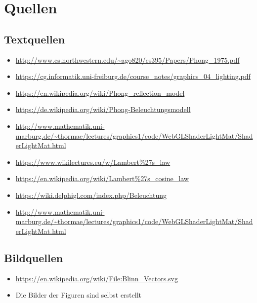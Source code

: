 \documentclass[a4paper]{scrartcl}%
\begin{document}
\newpage

\section{Quellen}%
\label{sec:quellen}

    \subsection{Textquellen}%
    \label{sub:textquellen}
    
        \begin{itemize}
            \item \url{http://www.cs.northwestern.edu/~ago820/cs395/Papers/Phong_1975.pdf} 
            \item \url{https://cg.informatik.uni-freiburg.de/course_notes/graphics_04_lighting.pdf} 
            \item \url{https://en.wikipedia.org/wiki/Phong_reflection_model} 
            \item \url{https://de.wikipedia.org/wiki/Phong-Beleuchtungsmodell} 
            \item \url{http://www.mathematik.uni-marburg.de/~thormae/lectures/graphics1/code/WebGLShaderLightMat/ShaderLightMat.html} 
            \item \url{https://www.wikilectures.eu/w/Lambert%27s_law} 
            \item \url{https://en.wikipedia.org/wiki/Lambert%27s_cosine_law} 
            \item \url{https://wiki.delphigl.com/index.php/Beleuchtung} 
            \item \url{http://www.mathematik.uni-marburg.de/~thormae/lectures/graphics1/code/WebGLShaderLightMat/ShaderLightMat.html} 
        \end{itemize}

    \subsection{Bildquellen}%
    \label{sub:bildquellen}
    
        \begin{itemize}
            \item \url{https://en.wikipedia.org/wiki/File:Blinn_Vectors.svg}
            \item Die Bilder der Figuren sind selbst erstellt
        \end{itemize} %
\end{document}
